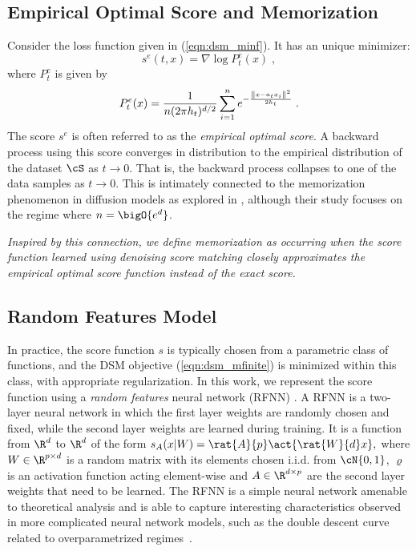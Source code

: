 \subsection{Empirical Optimal Score and Memorization}\label{sec:empirical_opt_score}
Consider the loss function given in (\ref{eqn:dsm_minf}). It has an unique minimizer: 
\begin{equation}\label{eqn:empirical_opt_score}
    s^e(t,x) = \nabla\log P^e_t(x) \;,
\end{equation}
where $P^e_t$ is given by
\begin{equation}\label{eqn:marginal_prob_empirical}
    P_t^e(x) = \frac{1}{n(2\pi h_t)^{d/2}}\sum_{i=1}^ne^{-\frac{\norm{x-a_tx_i}^2}{2h_t}} \;.
\end{equation}
The score $s^e$ is often referred to as the \textit{empirical optimal score}. A backward process using this score converges in distribution to the empirical distribution of the dataset $\cS$ as $t\rightarrow 0$. That is, the backward process collapses to one of the data samples as $t\rightarrow 0$. This is intimately connected to the memorization phenomenon in diffusion models as explored in \cite{biroli_dynamical_2024}, although their study focuses on the regime where $n=\bigO{e^d}$. 

\textit{Inspired by this connection, we define memorization as occurring when the score function learned using denoising score matching closely approximates the empirical optimal score function instead of the exact score.} 


\subsection{Random Features Model}
In practice, the score function $s$ is typically chosen from a parametric class of functions, and the DSM objective (\ref{eqn:dsm_mfinite}) is minimized within this class, with appropriate regularization. In this work, we represent the score function using a \textit{random features} neural network (RFNN) \cite{rahimi_random_2007}. A RFNN is a two-layer neural network in which the first layer weights are randomly chosen and fixed, while the second layer weights are learned during training. It is a function from $\R^d$ to $\R^d$ of the form
$s_A(x|W) = \rat{A}{p}\act{\rat{W}{d}x},$
where $W\in\R^{p\times d}$ is a random matrix with its elements chosen i.i.d. from $\cN{0,1}$, $\varrho$ is an activation function acting element-wise and $A\in\R^{d\times p}$ are the second layer weights that need to be learned. The RFNN is a simple neural network amenable to theoretical analysis and is able to capture interesting characteristics observed in more complicated neural network models, such as the double descent curve related to overparametrized regimes~\cite{mei_generalization_2022,bodin_model_2021}.